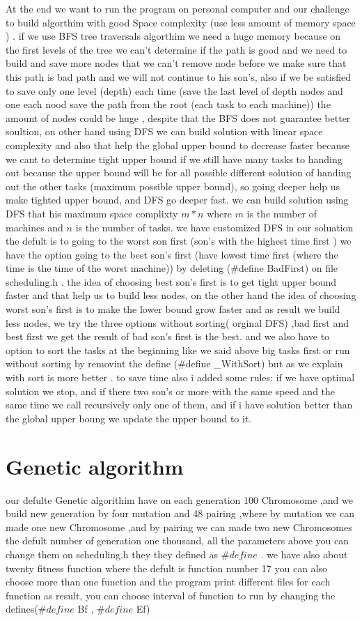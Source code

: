 \documentclass[11pt,fullpage]{article}
\begin{document}
 At the end we want to run the program on personal computer and our challenge to build algorthim with good Space complexity (use less amount of memory space ) . if we use BFS tree traversals algorthim we need a huge memory because on the first levels of the tree we can't determine if the path is good and we need to build  and save more nodes that we can't remove node before we make sure that this path is bad path and we will not continue to his son's, also if we be satisfied  to save only one level (depth) each time (save the last level of depth nodes and one each nood save the path from the root (each task to each machine))  the amount of nodes could be huge , despite that the BFS does not guarantee better soultion, on other hand using DFS we can build solution with linear space complexity and also that help the global upper bound to decrease faster because we cant to determine tight upper bound if we still have many tasks to handing out because the upper bound will be for all possible different solution of handing out the other tasks (maximum possible upper bound), so going deeper help us make tighted upper bound, and DFS go deeper fast. we can build solution using DFS that his maximum space complixty $m*n$ where $m$ is the number of machines and $n$ is the number of tasks.\newline
we have customized DFS in our soluation the defult is to going to the worst son first (son's with the highest time first ) we have the option going to the best son's first (have lowest time first (where the time is the time of the worst machine)) by deleting ($\#$define BadFirst) on file scheduling.h . the idea of choosing  best son's first is to get tight upper bound faster and that help us to build less nodes, on the other hand the idea of choosing worst son's first is to  make the lower bound grow faster and as result we build less nodes, we try the three options without sorting( orginal DFS) ,bad first and best first we get the result of bad son's first is the best. and we also have to option to sort the tasks at the beginning like we said above big tasks first  or run without sorting by removint the define ($\#$define \_WithSort) but as we explain with sort is more better .
to save time also i added some rules: if we have optimal solution we stop, and if there two son's or more with the same speed and the same time we call recursively only one of them, and if i have solution better than the global upper boung we  update the upper bound to it.   
\section{Genetic algorithm}
our defulte Genetic algorithim have on each generation 100 Chromosome ,and we build new generation by four mutation and 48 pairing ,where by mutation we can made one new Chromosome ,and by pairing we can made two new Chromosomes the defult number of generation one thousand, all the parameters above you can change them on scheduling.h they they defined as $\#define$ . we have also about twenty fitness function where the defult is function number 17 you can also  choose more than one function and the program print different files  for each function as result, you can choose interval of function to run by changing the defines($\#define   $ Bf ,  $\#define  $ Ef) 
\end{document}
